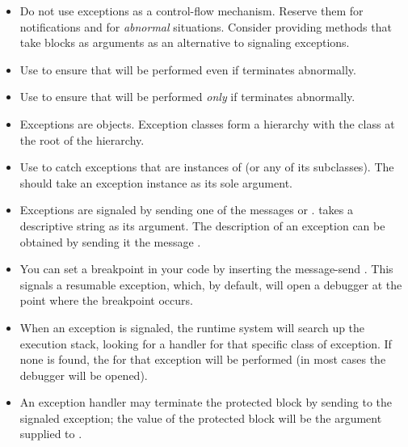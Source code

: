 \begin{itemize}
\item Do not use exceptions as a control-flow mechanism.  Reserve them for notifications and for \emph{abnormal} situations.  Consider providing methods that take blocks as arguments as an alternative to signaling exceptions.

\item Use  to ensure that  will be performed even if  terminates abnormally.

\item Use  to ensure that  will be performed \emph{only} if  terminates abnormally.

\item Exceptions are objects. Exception classes form a hierarchy with the class  at the root of the hierarchy.

\item Use  to catch exceptions that are instances of  (or any of its subclasses). The  should take an exception instance as its sole argument.

\item Exceptions are signaled by sending one of the messages  or .  takes a descriptive string as its argument. The description of an exception can be obtained by sending it the message .

\item You can set a breakpoint in your code by inserting the message-send . This signals a resumable  exception, which, by default, will open a debugger at the point where the breakpoint occurs.

\item When an exception is signaled, the runtime system will search up the execution stack, looking for a handler for that specific class of exception. If none is found, the  for that exception will be performed (\ie in most cases the debugger will be opened).

\item An exception handler may terminate the protected block by sending  to the signaled exception; the value of the protected block will be the argument supplied to . 


\end{itemize}
